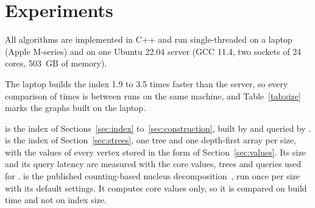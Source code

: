 \section{Experiments}\label{sec:exp}

All algorithms are implemented in C++ and run single-threaded on a laptop (Apple M-series) and on one Ubuntu 22.04 server (GCC 11.4, two sockets of 24 cores, 503~GB of memory).

%
The laptop builds the index 1.9 to 3.5 times faster than the server, so every comparison of times is between runs on the same machine, and Table~\ref{tab:size} marks the graphs built on the laptop.

\chainidx is the index of Sections~\ref{sec:index} to~\ref{sec:construction}, built by \build and queried by \query.
%
\strees is the index of Section~\ref{sec:strees}, one tree and one depth-first array per size, with the values of every vertex stored in the form of Section~\ref{sec:values}.
%
Its size and its query latency are measured with the core values, trees and queries used for \chainidx.
%
\cnd is the published counting-based nucleus decomposition~\cite{Zhang2026NucleusCounting}, run once per size with its default settings.
%
It computes core values only, so it is compared on build time and not on index size.

